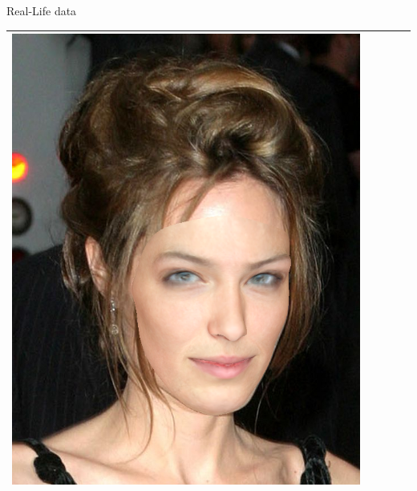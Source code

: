 \documentclass{beamer}
\begin{document}
\begin{frame}[c]{Real-Life data}
\begin{table}[h!]
\begin{tabular}{ | m{1.8cm} | m{1.8cm} | m{1.8cm}| m{1.8cm} | m{1.8cm} |}
\begin{minipage}{1.8cm}
				\includegraphics[width=\linewidth]{realLife/test0_overlay_FCN.png}
				\vspace{1pt}
			\end{minipage} \\ \hline
			

\end{tabular}
\end{table}
\end{frame}
\end{document}
